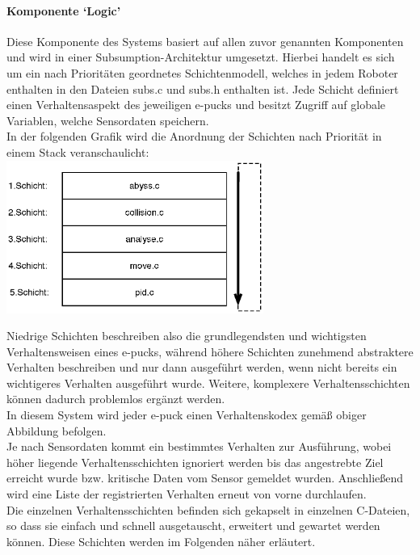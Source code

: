\documentclass[10pt,a4paper]{article}
\begin{document}
		\paragraph*{Komponente `Logic'}
			Diese Komponente des Systems basiert auf allen zuvor genannten Komponenten und wird in einer Subsumption-Architektur umgesetzt. Hierbei
			handelt es sich um ein nach Prioritäten geordnetes Schichtenmodell, welches in jedem Roboter enthalten in den Dateien subs.c und subs.h enthalten
			ist. Jede Schicht definiert einen Verhaltensaspekt des jeweiligen e-pucks und besitzt Zugriff auf globale Variablen, welche Sensordaten speichern. \\
                                    In der folgenden Grafik wird die Anordnung der Schichten nach Priorität in einem Stack veranschaulicht: \\ 

			\includegraphics[height=5cm]{images/subsumption.eps}

			Niedrige Schichten beschreiben also die grundlegendsten und wichtigsten Verhaltensweisen eines e-pucks, während höhere Schichten zunehmend
			abstraktere Verhalten beschreiben und nur dann ausgeführt werden, wenn nicht bereits ein wichtigeres Verhalten ausgeführt wurde. Weitere,
			komplexere Verhaltensschichten können dadurch problemlos ergänzt werden.\\ 
			In diesem System wird jeder e-puck einen Verhaltenskodex gemäß obiger Abbildung befolgen. \\
			Je nach Sensordaten kommt ein bestimmtes Verhalten zur Ausführung, wobei höher liegende Verhaltensschichten ignoriert werden bis das
			angestrebte Ziel erreicht wurde bzw. kritische Daten vom Sensor gemeldet wurden. Anschließend wird eine Liste der registrierten Verhalten
			erneut von vorne durchlaufen. \\
			Die einzelnen Verhaltensschichten befinden sich gekapselt in einzelnen C-Dateien, so dass sie einfach und schnell ausgetauscht, erweitert und
			gewartet werden können. Diese Schichten werden im Folgenden näher erläutert. \\
\end{document}
